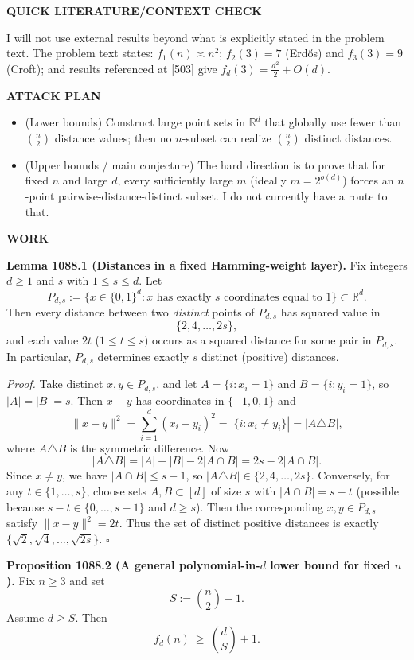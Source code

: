\textbf{QUICK LITERATURE/CONTEXT CHECK}

I will not use external results beyond what is explicitly stated in the problem text.
The problem text states: $f_1(n)\asymp n^2$; $f_2(3)=7$ (Erd\H{o}s) and $f_3(3)=9$ (Croft); and results referenced at [503] give $f_d(3)=\frac{d^2}{2}+O(d)$.

\textbf{ATTACK PLAN}

\begin{itemize}
\item (Lower bounds) Construct large point sets in $\mathbb{R}^d$ that globally use fewer than $\binom{n}{2}$ distance values; then no $n$-subset can realize $\binom{n}{2}$ distinct distances.
\item (Upper bounds / main conjecture) The hard direction is to prove that for fixed $n$ and large $d$, every sufficiently large $m$ (ideally $m=2^{o(d)}$) forces an $n$-point pairwise-distance-distinct subset. I do not currently have a route to that.
\end{itemize}

\textbf{WORK}

\textbf{Lemma 1088.1 (Distances in a fixed Hamming-weight layer).}
Fix integers $d\ge 1$ and $s$ with $1\le s\le d$. Let
\[P_{d,s}:=\{x\in\{0,1\}^d : x \text{ has exactly } s \text{ coordinates equal to }1\}\subset \mathbb{R}^d.
\]
Then every distance between two \emph{distinct} points of $P_{d,s}$ has squared value in
\[\{2,4,\dots,2s\},\]
and each value $2t$ ($1\le t\le s$) occurs as a squared distance for some pair in $P_{d,s}$. In particular, $P_{d,s}$ determines exactly $s$ distinct (positive) distances.

\emph{Proof.}
Take distinct $x,y\in P_{d,s}$, and let $A=\{i: x_i=1\}$ and $B=\{i: y_i=1\}$, so $|A|=|B|=s$.
Then $x-y$ has coordinates in $\{-1,0,1\}$ and
\[\|x-y\|^2=\sum_{i=1}^d (x_i-y_i)^2 = |\{i: x_i\ne y_i\}| = |A\triangle B|,
\]
where $A\triangle B$ is the symmetric difference.
Now
\[|A\triangle B| = |A|+|B|-2|A\cap B| = 2s-2|A\cap B|.
\]
Since $x\neq y$, we have $|A\cap B|\le s-1$, so $|A\triangle B|\in\{2,4,\dots,2s\}$.
Conversely, for any $t\in\{1,\dots,s\}$, choose sets $A,B\subset[d]$ of size $s$ with $|A\cap B|=s-t$ (possible because $s-t\in\{0,\dots,s-1\}$ and $d\ge s$). Then the corresponding $x,y\in P_{d,s}$ satisfy $\|x-y\|^2=2t$.
Thus the set of distinct positive distances is exactly $\{\sqrt{2},\sqrt{4},\dots,\sqrt{2s}\}$.
\hfill$\square$

\textbf{Proposition 1088.2 (A general polynomial-in-$d$ lower bound for fixed $n$).}
Fix $n\ge 3$ and set
\[S:=\binom{n}{2}-1.
\]
Assume $d\ge S$. Then
\[f_d(n)\ \ge\ \binom{d}{S}+1.
\]

